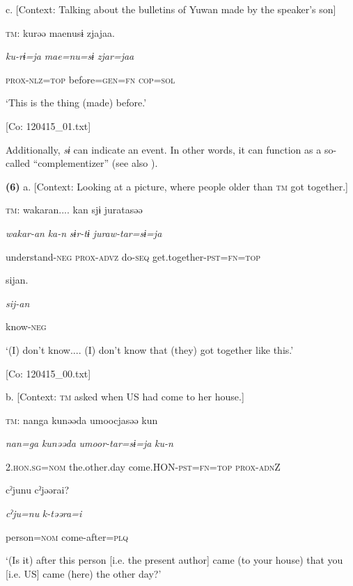   c.  [Context: Talking about the bulletins of Yuwan made by the speaker’s son]

    \textsc{tm}:  kurəə  {\textbar}mae{\textbar}nusɨ  zjajaa.

      \textit{ku-rɨ=ja}  \textit{mae=nu=sɨ}  \textit{zjar=jaa}

      \textsc{prox}-\textsc{nlz}=\textsc{top}  before=\textsc{gen}=\textsc{fn}  \textsc{cop}=\textsc{sol}

      ‘This is the thing (made) before.’

      [Co: 120415\_01.txt]

Additionally, \textit{sɨ} can indicate an event. In other words, it can function as a so-called “complementizer” (see also ).

\textbf{(6)}  a.  [Context: Looking at a picture, where people older than \textsc{tm} got together.]

    \textsc{tm}:  wakaran....  kan  sjɨ  juratasəə

      \textit{wakar-an}  \textit{ka-n}  \textit{sɨr-tɨ}  \textit{juraw-tar=sɨ=ja}

      understand-\textsc{neg}  \textsc{prox}-\textsc{advz}  do-\textsc{seq}  get.together-\textsc{pst}=\textsc{fn}=\textsc{top}

      sijan.

      \textit{sij-an}

      know-\textsc{neg}

      ‘(I) don’t know.... (I) don’t know that (they) got together like this.’

      [Co: 120415\_00.txt]

  b.  [Context: \textsc{tm} asked when US had come to her house.]

    \textsc{tm}:  nanga  kunəəda  umoocjasəə  kun

      \textit{nan=ga}  \textit{kunəəda}  \textit{umoor-tar=sɨ=ja}  \textit{ku-n}

      2.\textsc{hon}.\textsc{sg}=\textsc{nom}  the.other.day  come.HON-\textsc{pst}=\textsc{fn}=\textsc{top}  \textsc{prox}-\textsc{adn}Z

      cˀjunu  cˀjəərai?

      \textit{cˀju=nu}  \textit{k-təəra=i}

      person=\textsc{nom}  come-after=\textsc{plq}

      ‘(Is it) after this person [i.e. the present author] came (to your house) that you [i.e. US] came (here) the other day?’

